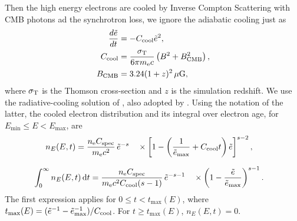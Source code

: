 Then the high energy electrons are cooled by Inverse Compton Scattering with CMB photons ad the synchrotron loss, we ignore the adiabatic cooling just as \citet{HoeftBruggen2007}
\begin{equation}
\begin{aligned}
\frac{d\tilde e}{dt}&=-C_{\rm cool}\tilde e^{2},\\
C_{\rm cool}&=
\frac{\sigma_{\rm T}}{6\pi m_{\rm e}c}
\left(B^{2}+B_{\rm CMB}^{2}\right),\\
B_{\rm CMB}&=3.24(1+z)^{2}\,\mu{\rm G},
\end{aligned}
\label{eq:radio_cooling}
\end{equation}
where $\sigma_{\rm T}$ is the Thomson cross-section and $z$ is
the simulation redshift.
We use the radiative-cooling solution of \citet{Kardashev1962}, also adopted by
\citet{HoeftBruggen2007}. Using the notation of the latter, the cooled electron distribution and its integral over electron age, for $E_{\min}\leq E<E_{\max}$, are
\begin{equation}
\begin{aligned}
n_E(E,t)
&= \frac{n_{\rm e}C_{\rm spec}}{m_{\rm e}c^2}
\,\tilde e^{-s}
\quad\times
\left[
1-\left(
\frac{1}{\tilde e_{\max}}+C_{\rm cool}t
\right)\tilde e
\right]^{s-2},
\end{aligned}
\label{eq:radio_cooled_spectrum}
\end{equation}

\begin{equation}
\begin{aligned}
\int_0^\infty n_E(E,t)\,\mathrm{d}t
&= \frac{n_{\rm e}C_{\rm spec}}
{m_{\rm e}c^2 C_{\rm cool}(s-1)}
\,\tilde e^{-s-1}
\quad\times
\left(
1-\frac{\tilde e}{\tilde e_{\max}}
\right)^{s-1}.
\end{aligned}
\label{eq:radio_age_integral}
\end{equation}
The first expression applies for $0\leq t<t_{\max}(E)$,
where
$t_{\max}(E)=(\tilde e^{-1}-\tilde e_{\max}^{-1})/C_{\rm cool}$.
For $t\geq t_{\max}(E)$, $n_E(E,t)=0$.

